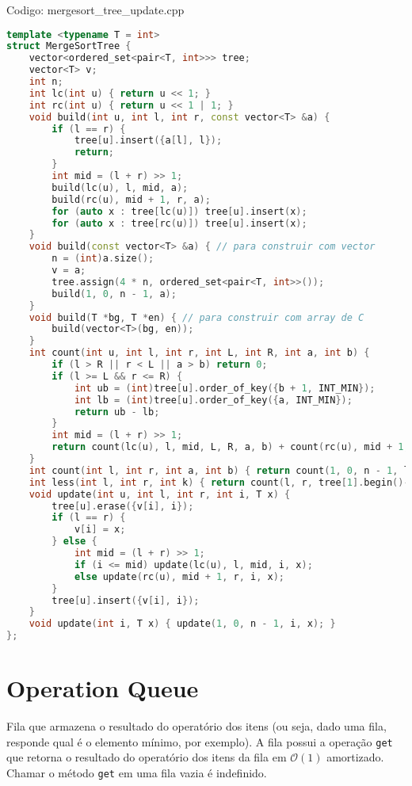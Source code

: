 \documentclass[10pt, a4paper, oneside]{book}
\begin{document}
Codigo: mergesort\_tree\_update.cpp

\begin{lstlisting}[language=C++]
template <typename T = int>
struct MergeSortTree {
    vector<ordered_set<pair<T, int>>> tree;
    vector<T> v;
    int n;
    int lc(int u) { return u << 1; }
    int rc(int u) { return u << 1 | 1; }
    void build(int u, int l, int r, const vector<T> &a) {
        if (l == r) {
            tree[u].insert({a[l], l});
            return;
        }
        int mid = (l + r) >> 1;
        build(lc(u), l, mid, a);
        build(rc(u), mid + 1, r, a);
        for (auto x : tree[lc(u)]) tree[u].insert(x);
        for (auto x : tree[rc(u)]) tree[u].insert(x);
    }
    void build(const vector<T> &a) { // para construir com vector
        n = (int)a.size();
        v = a;
        tree.assign(4 * n, ordered_set<pair<T, int>>());
        build(1, 0, n - 1, a);
    }
    void build(T *bg, T *en) { // para construir com array de C
        build(vector<T>(bg, en));
    }
    int count(int u, int l, int r, int L, int R, int a, int b) {
        if (l > R || r < L || a > b) return 0;
        if (l >= L && r <= R) {
            int ub = (int)tree[u].order_of_key({b + 1, INT_MIN});
            int lb = (int)tree[u].order_of_key({a, INT_MIN});
            return ub - lb;
        }
        int mid = (l + r) >> 1;
        return count(lc(u), l, mid, L, R, a, b) + count(rc(u), mid + 1, r, L, R, a, b);
    }
    int count(int l, int r, int a, int b) { return count(1, 0, n - 1, l, r, a, b); }
    int less(int l, int r, int k) { return count(l, r, tree[1].begin()->first, k - 1); }
    void update(int u, int l, int r, int i, T x) {
        tree[u].erase({v[i], i});
        if (l == r) {
            v[i] = x;
        } else {
            int mid = (l + r) >> 1;
            if (i <= mid) update(lc(u), l, mid, i, x);
            else update(rc(u), mid + 1, r, i, x);
        }
        tree[u].insert({v[i], i});
    }
    void update(int i, T x) { update(1, 0, n - 1, i, x); }
};
\end{lstlisting}
\hfill

\section{Operation Queue}


Fila que armazena o resultado do operatório dos itens (ou seja, dado uma fila, responde qual é o elemento mínimo, por exemplo). A fila possui a operação \texttt{get} que retorna o resultado do operatório dos itens da fila em $\mathcal{O}(1)$ amortizado. Chamar o método \texttt{get} em uma fila vazia é indefinido.
\end{document}
